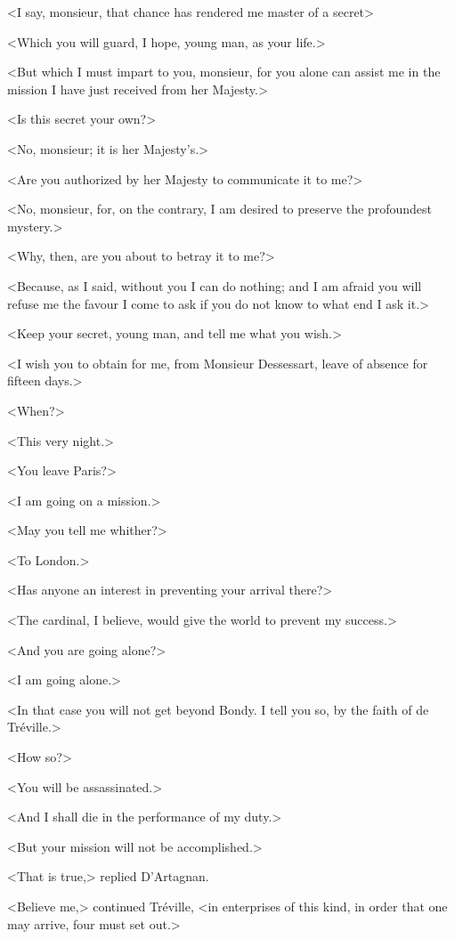 <I say, monsieur, that chance has rendered me master of a secret\longdash> 

<Which you will guard, I hope, young man, as your life.> 

<But which I must impart to you, monsieur, for you alone can assist me in the mission I have just received from her Majesty.> 

<Is this secret your own?> 

<No, monsieur; it is her Majesty's.> 

<Are you authorized by her Majesty to communicate it to me?> 

<No, monsieur, for, on the contrary, I am desired to preserve the profoundest mystery.> 

<Why, then, are you about to betray it to me?> 

<Because, as I said, without you I can do nothing; and I am afraid you will refuse me the favour I come to ask if you do not know to what end I ask it.> 

<Keep your secret, young man, and tell me what you wish.> 

<I wish you to obtain for me, from Monsieur Dessessart, leave of absence for fifteen days.> 

<When?> 

<This very night.> 

<You leave Paris?> 

<I am going on a mission.> 

<May you tell me whither?> 

<To London.> 

<Has anyone an interest in preventing your arrival there?> 

<The cardinal, I believe, would give the world to prevent my success.> 

<And you are going alone?> 

<I am going alone.> 

<In that case you will not get beyond Bondy. I tell you so, by the faith of de Tréville.> 

<How so?> 

<You will be assassinated.> 

<And I shall die in the performance of my duty.> 

<But your mission will not be accomplished.> 

<That is true,> replied D'Artagnan. 

<Believe me,> continued Tréville, <in enterprises of this kind, in order that one may arrive, four must set out.> 

